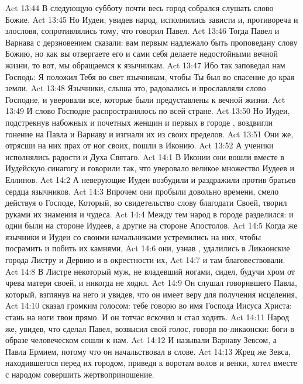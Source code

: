 \rsbpar\vs Act 13:44 В следующую субботу почти весь город собрался слушать слово Божие.
\vs Act 13:45 Но Иудеи, увидев народ, исполнились зависти и, противореча и злословя, сопротивлялись тому, что говорил Павел.
\vs Act 13:46 Тогда Павел и Варнава с дерзновением сказали: вам первым надлежало быть проповедану слову Божию, но как вы отвергаете его и сами себя делаете недостойными вечной жизни, то вот, мы обращаемся к язычникам.
\vs Act 13:47 Ибо так заповедал нам Господь: Я положил Тебя во свет язычникам, чтобы Ты был во спасение до края земли.
\vs Act 13:48 Язычники, слыша это, радовались и прославляли слово Господне, и уверовали все, которые были предуставлены к вечной жизни.
\vs Act 13:49 И слово Господне распространялось по всей стране.
\vs Act 13:50 Но Иудеи, подстрекнув набожных и почетных женщин и первых в городе , воздвигли гонение на Павла и Варнаву и изгнали их из своих пределов.
\vs Act 13:51 Они же, отрясши на них прах от ног своих, пошли в Иконию.
\vs Act 13:52 А ученики исполнялись радости и Духа Святаго.
\vs Act 14:1 В Иконии они вошли вместе в Иудейскую синагогу и говорили так, что уверовало великое множество Иудеев и Еллинов.
\vs Act 14:2 А неверующие Иудеи возбудили и раздражили против братьев сердца язычников.
\vs Act 14:3 Впрочем они пробыли  довольно времени, смело действуя о Господе, Который, во свидетельство слову благодати Своей, творил руками их знамения и чудеса.
\vs Act 14:4 Между тем народ в городе разделился: и одни были на стороне Иудеев, а другие на стороне Апостолов.
\vs Act 14:5 Когда же язычники и Иудеи со своими начальниками устремились на них, чтобы посрамить и побить их камнями,
\vs Act 14:6 они, узнав , удалились в Ликаонские города Листру и Дервию и в окрестности их,
\vs Act 14:7 и там благовествовали.
\rsbpar\vs Act 14:8 В Листре некоторый муж, не владевший ногами, сидел, будучи хром от чрева матери своей, и никогда не ходил.
\vs Act 14:9 Он слушал говорившего Павла, который, взглянув на него и увидев, что он имеет веру для получения исцеления,
\vs Act 14:10 сказал громким голосом: тебе говорю во имя Господа Иисуса Христа: стань на ноги твои прямо. И он тотчас вскочил и стал ходить.
\vs Act 14:11 Народ же, увидев, что сделал Павел, возвысил свой голос, говоря по-ликаонски: боги в образе человеческом сошли к нам.
\vs Act 14:12 И называли Варнаву Зевсом, а Павла Ермием, потому что он начальствовал в слове.
\vs Act 14:13 Жрец же  Зевса, находившегося перед их городом, приведя к воротам волов и  венки, хотел вместе с народом совершить жертвоприношение.
